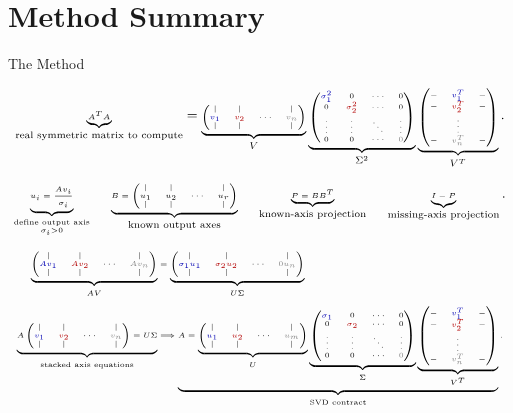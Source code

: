 \documentclass[10pt]{beamer}
\theoremstyle{definition}
\newcommand{\rd}[1]{{\color{red!70!black}#1}}
\newcommand{\bl}[1]{{\color{blue!70!black}#1}}
\newcommand{\gry}[1]{{\color{gray}#1}}
\newcommand{\Vcols}{\begin{pmatrix}|&|& &|\\ \bl{v_1}&\rd{v_2}&\cdots&\gry{v_n}\\ |&|& &|\end{pmatrix}}
\newcommand{\Ucols}{\begin{pmatrix}|&|& &|\\ \bl{u_1}&\rd{u_2}&\cdots&\gry{u_m}\\ |&|& &|\end{pmatrix}}
\newcommand{\Vrows}{\begin{pmatrix}-&\bl{v_1^T}&-\\ -&\rd{v_2^T}&-\\ &\vdots&\\ -&\gry{v_n^T}&-\end{pmatrix}}
\newcommand{\Sigdisplay}{\begin{pmatrix}\bl{\sigma_1}&0&\cdots&0\\ 0&\rd{\sigma_2}&\cdots&0\\ \vdots&\vdots&\ddots&\vdots\\ 0&0&\cdots&\gry{0}\end{pmatrix}}
\newcommand{\SigTsigdisplay}{\begin{pmatrix}\bl{\sigma_1^2}&0&\cdots&0\\ 0&\rd{\sigma_2^2}&\cdots&0\\ \vdots&\vdots&\ddots&\vdots\\ 0&0&\cdots&\gry{0}\end{pmatrix}}
\begin{document}
\section{Method Summary}

\begin{frame}[shrink=18]{The Method}

\[
\tiny
\underbrace{A^TA}_{\text{real symmetric matrix to compute}}
=
\underbrace{\Vcols}_{V}
\underbrace{\SigTsigdisplay}_{\Sigma^2}
\underbrace{\Vrows}_{V^T}.
\]

\vfill

\[
\tiny
\underbrace{u_i=\frac{Av_i}{\sigma_i}}_{\substack{\text{define output axis}\\\sigma_i>0}}
\qquad
\underbrace{
B=
\begin{pmatrix}|&|& &|\\
u_1&u_2&\cdots&u_r\\
|&|& &|
\end{pmatrix}}_{\text{known output axes}}
\qquad
\underbrace{P=BB^T}_{\text{known-axis projection}}
\qquad
\underbrace{I-P}_{\text{missing-axis projection}}.
\]

\vfill

\[
\tiny
\begin{aligned}
\underbrace{
\begin{pmatrix}|&|& &|\\
\bl{Av_1}&\rd{Av_2}&\cdots&\gry{Av_n}\\
|&|& &|
\end{pmatrix}}_{AV}
&=
\underbrace{
\begin{pmatrix}|&|& &|\\
\bl{\sigma_1u_1}&\rd{\sigma_2u_2}&\cdots&\gry{0u_n}\\
|&|& &|
\end{pmatrix}}_{U\Sigma}\\[0.4em]
\underbrace{A\Vcols=U\Sigma}_{\text{stacked axis equations}}
&\Longrightarrow
\underbrace{A=
\underbrace{\Ucols}_{U}
\underbrace{\Sigdisplay}_{\Sigma}
\underbrace{\Vrows}_{V^T}}_{\text{SVD contract}}.
\end{aligned}
\]

\end{frame}


\end{document}
